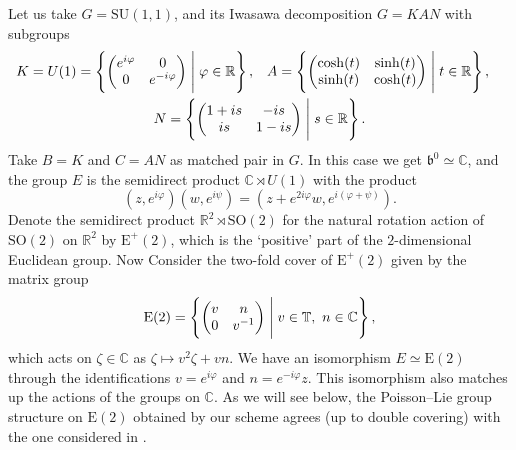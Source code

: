 \documentclass[a4paper,11pt]{amsart}
\newcommand{\R}{\mathbb R}
\newcommand{\C}{\mathbb C}
\newcommand{\bb}[1]{\mathbb{#1}}
\newcommand{\fr}[1]{\mathfrak{#1}}
\newcommand{\vph}{\varphi}
\newcommand{\SU}{\mathrm{SU}}
\newcommand{\SO}{\mathrm{SO}}
\newcommand{\rE}{\mathrm{E}}
\theoremstyle{definition}
\theoremstyle{remark}
\begin{document}
Let us take $G = \SU(1, 1)$, and its Iwasawa decomposition $G = K A N$ with subgroups
\begin{gather*}
\begin{align*}
K &= U(1) = \left\{ \begin{pmatrix} e^{i \vph} & 0 \\ 0 & e^{-i \vph}\end{pmatrix} \Biggm| \vph \in \R \right\},&
A &=  \left\{ \begin{pmatrix} \cosh(t) & \sinh(t) \\ \sinh(t) & \cosh(t) \end{pmatrix} \Biggm| t \in \R \right\},
\end{align*}\\
N = \left\{ \begin{pmatrix} 1 + i s &  - i s \\ i s & 1 - i s \end{pmatrix} \Biggm| s \in \R \right\}.
\end{gather*}
Take $B = K$ and $C = A N$ as matched pair in $G$.
In this case we get $\fr{b}^0 \simeq \C$, and the group $E$ is the semidirect product $\C \rtimes U(1)$ with the product
\[
(z,e^{i\vph})(w,e^{i\psi}) = (z + e^{2i\vph}w,e^{i(\vph+\psi)}).
\]
Denote the semidirect product $\R^2\rtimes \SO(2)$ for the natural rotation action of $\SO(2)$ on $\R^2$ by $\rE^+(2)$, which is the `positive' part of the $2$-dimensional Euclidean group.
Now Consider the two-fold cover of $\rE^+(2)$ given by the matrix group
\[
\rE(2) = \left\{ 
\begin{pmatrix}
v & n \\ 0 & v^{-1}
\end{pmatrix}
\Biggm| v \in \bb{T} , ~ n \in \C \right\} ,
\]
which acts on $\zeta\in\C$ as $\zeta \mapsto v^2\zeta + v n$.
We have an isomorphism $E \simeq \rE(2)$ through the identifications $v = e^{i\vph}$ and $n = e^{-i\vph}z$.
This isomorphism also matches up the actions of the groups on $\C$.
As we will see below, the Poisson--Lie group structure on $\rE(2)$ obtained by our scheme agrees (up to double covering) with the one considered in \cite{MR1267935}.
\end{document}
